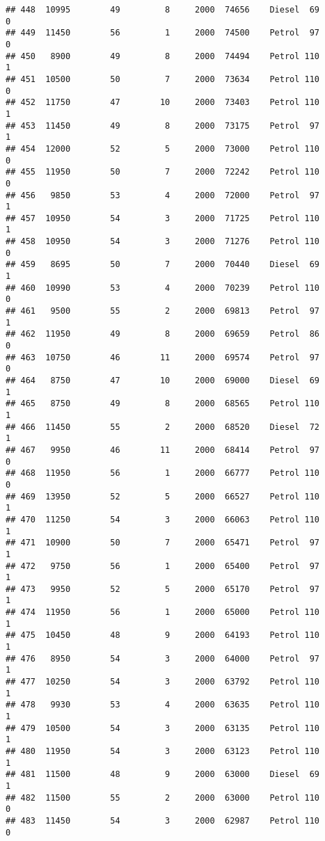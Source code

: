 \documentclass[]{article}
\begin{document}
\begin{verbatim}
## 448  10995        49         8     2000  74656    Diesel  69         0
## 449  11450        56         1     2000  74500    Petrol  97         0
## 450   8900        49         8     2000  74494    Petrol 110         1
## 451  10500        50         7     2000  73634    Petrol 110         0
## 452  11750        47        10     2000  73403    Petrol 110         1
## 453  11450        49         8     2000  73175    Petrol  97         1
## 454  12000        52         5     2000  73000    Petrol 110         0
## 455  11950        50         7     2000  72242    Petrol 110         0
## 456   9850        53         4     2000  72000    Petrol  97         1
## 457  10950        54         3     2000  71725    Petrol 110         1
## 458  10950        54         3     2000  71276    Petrol 110         0
## 459   8695        50         7     2000  70440    Diesel  69         1
## 460  10990        53         4     2000  70239    Petrol 110         0
## 461   9500        55         2     2000  69813    Petrol  97         1
## 462  11950        49         8     2000  69659    Petrol  86         0
## 463  10750        46        11     2000  69574    Petrol  97         0
## 464   8750        47        10     2000  69000    Diesel  69         1
## 465   8750        49         8     2000  68565    Petrol 110         1
## 466  11450        55         2     2000  68520    Diesel  72         1
## 467   9950        46        11     2000  68414    Petrol  97         0
## 468  11950        56         1     2000  66777    Petrol 110         0
## 469  13950        52         5     2000  66527    Petrol 110         1
## 470  11250        54         3     2000  66063    Petrol 110         1
## 471  10900        50         7     2000  65471    Petrol  97         1
## 472   9750        56         1     2000  65400    Petrol  97         1
## 473   9950        52         5     2000  65170    Petrol  97         1
## 474  11950        56         1     2000  65000    Petrol 110         1
## 475  10450        48         9     2000  64193    Petrol 110         1
## 476   8950        54         3     2000  64000    Petrol  97         1
## 477  10250        54         3     2000  63792    Petrol 110         1
## 478   9930        53         4     2000  63635    Petrol 110         1
## 479  10500        54         3     2000  63135    Petrol 110         1
## 480  11950        54         3     2000  63123    Petrol 110         1
## 481  11500        48         9     2000  63000    Diesel  69         1
## 482  11500        55         2     2000  63000    Petrol 110         0
## 483  11450        54         3     2000  62987    Petrol 110         0

\end{verbatim}
\end{document}
